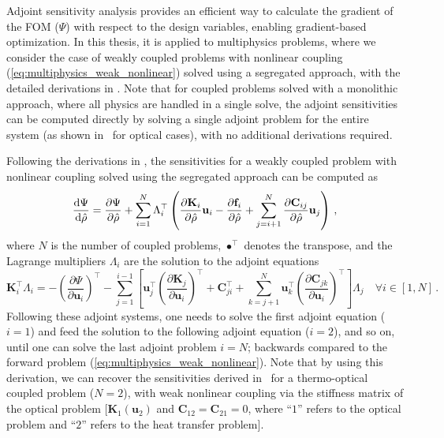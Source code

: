     Adjoint sensitivity analysis provides an efficient way to calculate the gradient of the FOM ($\Psi$) with respect to the design variables,
 enabling gradient-based optimization. In this thesis, it is applied to multiphysics problems,
 where we consider the case of weakly coupled problems with
 nonlinear coupling (\eqref{eq:multiphysics_weak_nonlinear}) solved using a segregated approach, with the detailed derivations in 
    . Note that for coupled problems solved with a monolithic approach, where all physics are handled
 in a single solve, the adjoint sensitivities can be computed directly by solving a single adjoint problem for the entire
 system (as shown in~\cite{jensen_review} for optical cases), with no additional derivations required.

 Following the derivations in , the sensitivities for a weakly coupled problem with nonlinear coupling solved using the segregated
 approach can be computed as
    \begin{equation}
 \frac{\mathop{}\!\text{d} \Psi}{\mathop{}\!\text{d} \hat{\rho}}  = \frac{\partial \Psi}{\partial \hat{\rho}} + \sum^N_{i=1} \Lambda_{i}^{\top} \left( \frac{\partial \mathbf{K}_i}{\partial \hat{\rho}} \mathbf{u}_i - \frac{\partial \mathbf{f}_i}{\partial \hat{\rho}} + \sum^N_{j=i+1} \frac{\partial \mathbf{C}_{ij}}{\partial \hat{\rho}} \mathbf{u}_j \right)\,,
    \end{equation}
 where $N$ is the number of coupled problems, $\bullet^\top$ denotes the transpose, and the Lagrange multipliers $\Lambda_i$ are the solution to the adjoint equations
    \begin{equation}\label{eq:adjoint_eqs}
      \mathbf{K}^\top_i \Lambda_i = -\left(\frac{\partial \Psi}{\partial \mathbf{u}_i}\right)^\top - \sum_{j=1}^{i-1} \left[ 
         \mathbf{u}^\top_j \left(\frac{\partial \mathbf{K}_j}{\partial \mathbf{u}_i}\right)^\top + \mathbf{C}^\top_{ji} + \sum^N_{k=j+1} \mathbf{u}^\top_k \left(\frac{\partial \mathbf{C}_{jk}}{\partial \mathbf{u}_i}\right)^\top \right]\Lambda_j  \quad \forall i \in [1, N] \,.
   \end{equation}
 Following these adjoint systems, one needs to solve the first adjoint equation ($i=1$) 
 and feed the solution to the following adjoint equation ($i=2$), and so on, until one can solve the last adjoint problem $i=N$; backwards compared to the forward problem (\eqref{eq:multiphysics_weak_nonlinear}).
 Note that by using this derivation, we can recover the sensitivities derived in~\cite{ownpub0} for a thermo-optical coupled problem ($N=2$), with weak nonlinear coupling
 via the stiffness matrix of the optical problem [$\mathbf{K}_1(\mathbf{u}_2)$ and $\mathbf{C}_{12}=\mathbf{C}_{21}=0$, where ``$1$'' refers to the optical problem and ``$2$'' refers to the 
 heat transfer problem].
    
